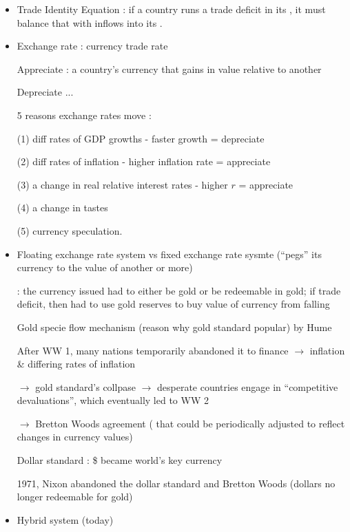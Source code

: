 \documentclass{article}
\begin{document}
\newpage
{}
\begin{itemize}
\item Trade Identity Equation : if a country runs a trade deficit in its , it must balance that with inflows into its .



\item Exchange rate : currency trade rate

Appreciate : a country's currency that gains in value relative to another

Depreciate ...

5 reasons exchange rates move :

(1) diff rates of GDP growths - faster growth = depreciate

(2) diff rates of inflation - higher inflation rate = appreciate

(3) a change in real relative interest rates - higher $r$ = appreciate

(4) a change in tastes

(5) currency speculation.


\item Floating exchange rate system vs fixed exchange rate sysmte (``pegs'' its currency to the value of another or more)

 : the currency issued had to either be gold or be redeemable in gold; if trade deficit, then had to use gold reserves to buy value of currency from falling

Gold specie flow mechanism (reason why gold standard popular) by Hume

After WW 1, many nations temporarily abandoned it to finance $\rightarrow$ inflation \& differing rates of inflation

$\rightarrow$ gold standard's collpase $\rightarrow$ desperate countries engage in ``competitive devaluations'', which eventually led to WW 2

$\rightarrow$ Bretton Woods agreement ( that could be periodically adjusted to reflect changes in currency values)

Dollar standard : \$ became world's key currency

1971, Nixon abandoned the dollar standard and Bretton Woods (dollars no longer redeemable for gold)

\item Hybrid system (today)


\end{itemize}
\end{document}

